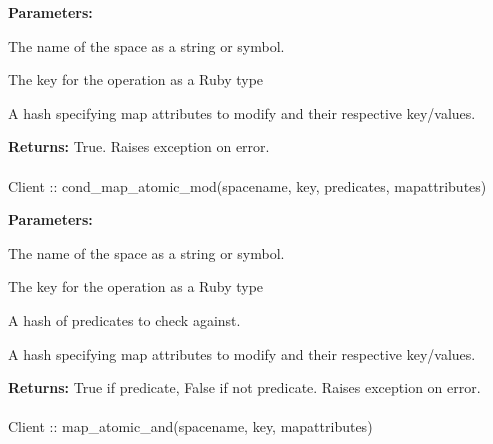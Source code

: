 \noindent\textbf{Parameters:}
\begin{description}[labelindent=\widthof{{\code{mapattributes}}},leftmargin=*,noitemsep,nolistsep,align=right]
\item[\code{spacename}] The name of the space as a string or symbol.
\item[\code{key}] The key for the operation as a Ruby type
\item[\code{mapattributes}] A hash specifying map attributes to modify and their respective key/values.
\end{description}

\noindent\textbf{Returns:}
True.  Raises exception on error.

\paragraph{}
\begin{ccode}
Client :: cond_map_atomic_mod(spacename, key, predicates, mapattributes)
\end{ccode}
\funcdesc 

\noindent\textbf{Parameters:}
\begin{description}[labelindent=\widthof{{\code{mapattributes}}},leftmargin=*,noitemsep,nolistsep,align=right]
\item[\code{spacename}] The name of the space as a string or symbol.
\item[\code{key}] The key for the operation as a Ruby type
\item[\code{predicates}] A hash of predicates to check against.
\item[\code{mapattributes}] A hash specifying map attributes to modify and their respective key/values.
\end{description}

\noindent\textbf{Returns:}
True if predicate, False if not predicate.  Raises exception on error.

\paragraph{}
\begin{ccode}
Client :: map_atomic_and(spacename, key, mapattributes)
\end{ccode}
\funcdesc 

